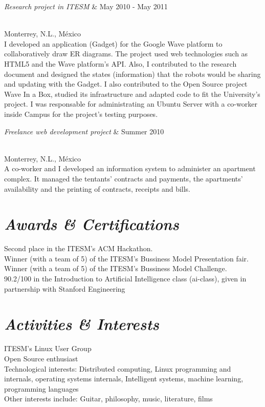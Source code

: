 \documentclass{res}
\begin{document}
\begin{resume}
\begin{ncolumn}{2}
{\it Research project in ITESM}  &   May 2010 - May 2011 
\end{ncolumn}\\
Monterrey, N.L., M\'{e}xico \\
I developed an application (Gadget) for the Google Wave platform to collaboratively draw ER diagrams. The project used web technologies such as HTML5 and the Wave platform's API. Also, I contributed to the research document and designed the states (information) that the robots would be sharing and updating with the Gadget. I also contributed to the Open Source project Wave In a Box, studied its infrastructure and adapted code to fit the University's project. I was responsable for administrating an Ubuntu Server with a co-worker inside Campus for the project's testing purposes.

\begin{ncolumn}{2}
{\it Freelance web development project}  &  Summer 2010 
\end{ncolumn}\\
Monterrey, N.L., M\'{e}xico \\
A co-worker and I developed an information system to administer an apartment complex. It managed the tentants' contracts and payments, the apartments' availability and the printing of contracts, receipts and bills.
	
\section{\sl  Awards \& Certifications}
Second place in the ITESM's ACM Hackathon. \\
Winner (with a team of 5) of the ITESM's Bussiness Model Presentation fair. \\
Winner (with a team of 5) of the ITESM's Bussiness Model Challenge. \\
90.2/100 in the Introduction to Artificial Intelligence class (ai-class), given in partnership with Stanford Engineering
 
\section{\sl  Activities \& Interests}
ITESM's Linux User Group\\
Open Source enthusiast \\
Technological interests: Distributed computing, Linux programming and internals, operating systems internals, Intelligent systems, machine learning, programming languages \\
Other interests include: Guitar, philosophy, music, literature, films

\end{resume}

\end{document}
